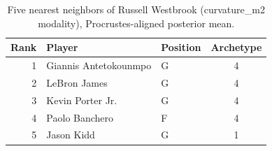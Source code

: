 \begin{table}[htbp]
  \centering\small
  \begin{tabular}{rllc}
    \toprule
    Rank & Player & Position & Archetype \\
    \midrule
    1 & Giannis Antetokounmpo & G & 4 \\
    2 & LeBron James & G & 4 \\
    3 & Kevin Porter Jr. & G & 4 \\
    4 & Paolo Banchero & F & 4 \\
    5 & Jason Kidd & G & 1 \\
    \bottomrule
  \end{tabular}
  \caption{Five nearest neighbors of Russell Westbrook (curvature_m2 modality), Procrustes-aligned posterior mean.}
  \label{tab:Russell_Westbrook_neighbors_curvature_m2}
\end{table}

